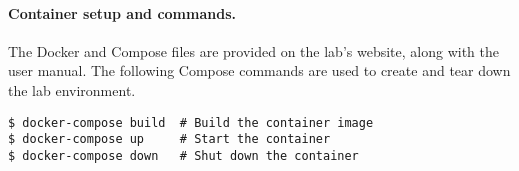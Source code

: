 
\paragraph{Container setup and commands.}
The Docker and Compose files are provided on the lab's website,
along with the user manual. The following Compose
commands are used to create and tear down
the lab environment.

\begin{lstlisting}
$ docker-compose build  # Build the container image
$ docker-compose up     # Start the container
$ docker-compose down   # Shut down the container
\end{lstlisting}

